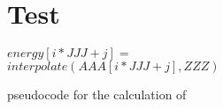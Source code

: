 \documentclass{beamer}
\begin{document}
\section{Test}
\begin{frame}[fragile]
\begin{algorithm}[H]
\begin{algorithmic}[1]
\STATE $energy[i*JJJ+j] =$ \\
$ interpolate(AAA[i*JJJ+j], ZZZ)$
\ENDFOR
\ENDFOR
\end{algorithmic}
\caption{pseudocode for the calculation of }
\label{alg:seq}
\end{algorithm}
\end{frame}
\end{document}
